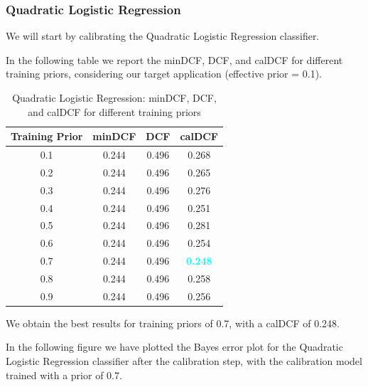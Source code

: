 \documentclass[12pt]{report}
\newcommand{\nnl}{%
    \newline
    \newline
}
\begin{document}
\subsubsection*{Quadratic Logistic Regression}
We will start by calibrating the Quadratic Logistic Regression classifier.
\nnl
In the following table we report the minDCF, DCF, and calDCF for different training priors, considering our target application (effective prior = 0.1).
\begin{table}[H]
    \centering
    \begin{tabular}{|c|c|c|c|}
        \hline
        \rowcolor{blue!10}
        \textbf{Training Prior} & \textbf{minDCF} & \textbf{DCF} & \textbf{calDCF}                  \\
        \hline
        0.1                     & 0.244           & 0.496        & 0.268                            \\
        \hline
        0.2                     & 0.244           & 0.496        & 0.265                            \\
        \hline
        0.3                     & 0.244           & 0.496        & 0.276                            \\
        \hline
        0.4                     & 0.244           & 0.496        & 0.251                            \\
        \hline
        0.5                     & 0.244           & 0.496        & 0.281                            \\
        \hline
        0.6                     & 0.244           & 0.496        & 0.254                            \\
        \hline
        0.7                     & 0.244           & 0.496        & \textcolor{cyan}{\textbf{0.248}} \\
        \hline
        0.8                     & 0.244           & 0.496        & 0.258                            \\
        \hline
        0.9                     & 0.244           & 0.496        & 0.256                            \\
        \hline
    \end{tabular}
    \caption{Quadratic Logistic Regression: minDCF, DCF, and calDCF for different training priors}
    \label{tab:QLR_Priors}
\end{table}
\noindent
We obtain the best results for training priors of 0.7, with a calDCF of 0.248.
\nnl
In the following figure we have plotted the Bayes error plot for the Quadratic Logistic Regression classifier after the calibration step, with the calibration model trained with a prior of 0.7.
\end{document}
